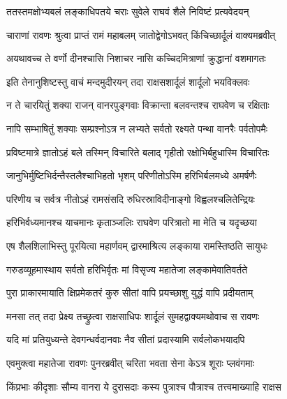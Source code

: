 
\twolineshloka
{ततस्तमक्षोभ्यबलं लङ्काधिपतये चराः}
{सुवेले राघवं शैले निविष्टं प्रत्यवेदयन्} %

\twolineshloka
{चाराणां रावणः श्रुत्वा प्राप्तं रामं महाबलम्}
{जातोद्वेगोऽभवत् किंचिच्छार्दूलं वाक्यमब्रवीत्} %

\twolineshloka
{अयथावच्च ते वर्णो दीनश्चासि निशाचर}
{नासि कच्चिदमित्राणां क्रुद्धानां वशमागतः} %

\twolineshloka
{इति तेनानुशिष्टस्तु वाचं मन्दमुदीरयन्}
{तदा राक्षसशार्दूलं शार्दूलो भयविक्लवः} %

\twolineshloka
{न ते चारयितुं शक्या राजन् वानरपुङ्गवाः}
{विक्रान्ता बलवन्तश्च राघवेण च रक्षिताः} %

\twolineshloka
{नापि सम्भाषितुं शक्याः सम्प्रश्नोऽत्र न लभ्यते}
{सर्वतो रक्ष्यते पन्था वानरैः पर्वतोपमैः} %

\twolineshloka
{प्रविष्टमात्रे ज्ञातोऽहं बले तस्मिन् विचारिते}
{बलाद् गृहीतो रक्षोभिर्बहुधास्मि विचारितः} %

\twolineshloka
{जानुभिर्मुष्टिभिर्दन्तैस्तलैश्चाभिहतो भृशम्}
{परिणीतोऽस्मि हरिभिर्बलमध्ये अमर्षणैः} %

\twolineshloka
{परिणीय च सर्वत्र नीतोऽहं रामसंसदि}
{रुधिरस्राविदीनाङ्गो विह्वलश्चलितेन्द्रियः} %

\twolineshloka
{हरिभिर्वध्यमानश्च याचमानः कृताञ्जलिः}
{राघवेण परित्रातो मा मेति च यदृच्छया} %

\twolineshloka
{एष शैलशिलाभिस्तु पूरयित्वा महार्णवम्}
{द्वारमाश्रित्य लङ्काया रामस्तिष्ठति सायुधः} %

\twolineshloka
{गरुडव्यूहमास्थाय सर्वतो हरिभिर्वृतः}
{मां विसृज्य महातेजा लङ्कामेवातिवर्तते} %

\twolineshloka
{पुरा प्राकारमायाति क्षिप्रमेकतरं कुरु}
{सीतां वापि प्रयच्छाशु युद्धं वापि प्रदीयताम्} %

\twolineshloka
{मनसा तत् तदा प्रेक्ष्य तच्छ्रुत्वा राक्षसाधिपः}
{शार्दूलं सुमहद्वाक्यमथोवाच स रावणः} %

\twolineshloka
{यदि मां प्रतियुध्यन्ते देवगन्धर्वदानवाः}
{नैव सीतां प्रदास्यामि सर्वलोकभयादपि} %

\twolineshloka
{एवमुक्त्वा महातेजा रावणः पुनरब्रवीत्}
{चरिता भवता सेना केऽत्र शूराः प्लवंगमाः} %

\twolineshloka
{किंप्रभाः कीदृशाः सौम्य वानरा ये दुरासदाः}
{कस्य पुत्राश्च पौत्राश्च तत्त्वमाख्याहि राक्षस} %

